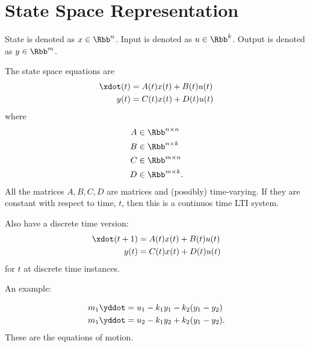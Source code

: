 \documentclass[10pt]{article}
\title{}
\author{}
\date{Aug. 26, 2014}
\begin{document}
\maketitle


\section{State Space Representation}
State is denoted as $x \in \Rbb^n$.
Input is denoted as $u \in \Rbb^k$.
Output is denoted as $y \in \Rbb^m$.

The state space equations are 
\begin{align}
  \xdot(t) &= A(t) x(t) + B(t)u(t)\\
  y(t)     &= C(t) x(t) + D(t)u(t)
\end{align}
where 
\begin{equation}
  \begin{split}
    A &\in \Rbb^{n\times n}\\
    B &\in \Rbb^{n\times k}\\
    C &\in \Rbb^{m\times n}\\
    D &\in \Rbb^{m\times k}.\\
  \end{split}
\end{equation}
All the matrices $ A,B,C,D$ are matrices and (possibly) time-varying.
If they are constant with respect to time, $t$, then this is a
continuos time LTI system.

Also have a discrete time version:
\begin{align}
  \xdot(t+1) &= A(t) x(t) + B(t)u(t)\\
  y(t)     &= C(t) x(t) + D(t)u(t)
\end{align}
for $t$ at discrete time instances.

An example:


\begin{equation}
  \begin{split}
    m_1\yddot &= u_1 - k_1y_1 - k_2(y_1 - y_2)\\
    m_1\yddot &= u_2 - k_1y_2 + k_2(y_1 - y_2).
  \end{split} %
\end{equation}
These are the equations of motion.
\end{document}
